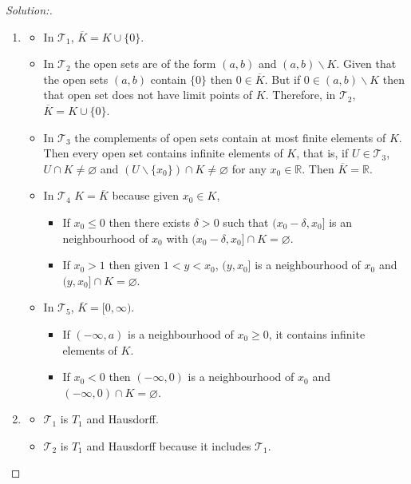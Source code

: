 \documentclass[a4paper,12pt, reqno]{article}
\theoremstyle{definition}
\newenvironment{solution}{\begin{proof}[Solution:]}{\end{proof}}
\newcommand{\R}{\mathbb{R}}
\newcommand{\T}{\mathscr{T}}
\begin{document}
\begin{solution}\hfill
  \begin{enumerate}[label = (\alph*)]
    \item \hfill
          \begin{itemize}
            \item In $\T_{1}$, $\overline{K} = K\cup \{ 0 \}$.
            \item In $\T_{2}$ the open sets are of the form $(a,b)$ and $(a,b)\backslash K$. Given that the open sets $(a,b)$ contain $\{ 0 \}$ then $0\in \overline{K}$. But if $0\in (a,b)\backslash K$ then that open set does not have limit points of $K$. Therefore, in $\T_{2}$, $\overline{K} = K\cup \{ 0 \}$.
            \item In $\T_{3}$ the complements of open sets contain at most finite elements of $K$. Then every open set contains infinite elements of $K$, that is, if $U\in\T_{3}$, $U\cap K\neq \varnothing$ and $(U\backslash\{ x_{0} \})\cap K \neq \varnothing$ for any $x_{0}\in\R$. Then $\overline{K} = \R$.
            \item In $\T_{4}$ $K = \overline{K}$ because given $x_{0}\in K$,
                  \begin{itemize}
                    \item If $x_{0}\leq0$ then there exists $\delta>0$ such that $(x_{0}-\delta,x_{0}]$ is an neighbourhood of $x_{0}$ with $(x_{0}-\delta,x_{0}]\cap K =\varnothing$.
                    \item If $x_{0}>1$ then given $1<y<x_{0}$, $(y,x_{0}]$ is a neighbourhood of $x_{0}$ and $(y,x_{0}]\cap K = \varnothing$.
                  \end{itemize}
            \item In $\T_{5}$, $\overline{K} = [0,\infty)$.
                  \begin{itemize}
                    \item If $(-\infty,a)$ is a neighbourhood of $x_{0}\geq0$, it contains infinite elements of $K$.
                    \item If $x_{0}<0$ then $(-\infty,0)$ is a neighbourhood of $x_{0}$ and $(-\infty,0)\cap K = \varnothing$.
                  \end{itemize}
          \end{itemize}
    \item \hfill
          \begin{itemize}
            \item[\checkmark] $\T_{1}$ is $T_{1}$ and Hausdorff.
            \item[\checkmark] $\T_{2}$ is $T_{1}$ and Hausdorff because it includes $\T_{1}$.

\end{itemize}
\end{enumerate}
\end{solution}
\end{document}

